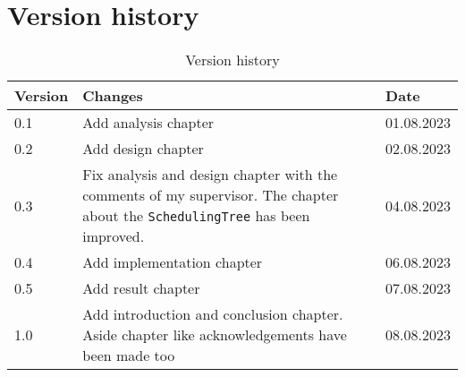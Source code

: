 \chapter{Version history}
\label{chap:report-versions}

\begin{table}[ht]
   \centering
   \begin{tabular}{|m{}|m{}|m{}|}
      \hline
      \textbf{Version} & \textbf{Changes} & \textbf{Date} \\ [0.5ex]
      \hline
      0.1 & Add analysis chapter & 01.08.2023  \\
      \hline
      0.2 & Add design chapter & 02.08.2023  \\
      \hline
      0.3 & Fix analysis and design chapter with the comments of my supervisor.
      The chapter about the \texttt{SchedulingTree} has been improved.
      & 04.08.2023  \\
      \hline
      0.4 & Add implementation chapter & 06.08.2023  \\
      \hline
      0.5 & Add result chapter & 07.08.2023  \\
      \hline
      1.0 & Add introduction and conclusion chapter. Aside chapter like
      acknowledgements have been made too & 08.08.2023  \\
   \end{tabular}
   \caption{Version history}
   \label{tab:version-history}
\end{table}